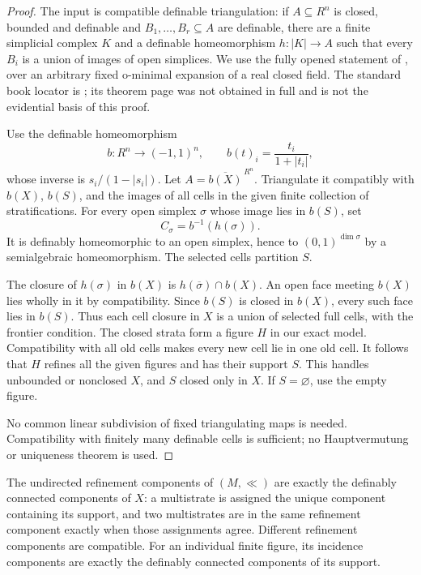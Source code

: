 \begin{proof}
The input is compatible definable triangulation:
if \(A\subseteq R^n\) is closed, bounded and
definable and \(B_1,\ldots,B_r\subseteq A\)
are definable, there are a finite simplicial
complex \(K\) and a definable homeomorphism
\(h:|K|\to A\) such that every \(B_i\)
is a union of images of open simplices.
We use the fully opened statement of
\citet[Theorem 4.4, \S4.3, p.~42;
proof pp.~42--44]{Coste1999}, over an
arbitrary fixed o-minimal expansion
of a real closed field.
The standard book locator is
\citet[Chapter 8, \S2, Theorem 2.9]{vandenDries1998};
its theorem page was not obtained
in full and is not the evidential
basis of this proof.

Use the definable homeomorphism
\[
 b:R^n\longrightarrow(-1,1)^n,\qquad
 b(t)_i=\frac{t_i}{1+|t_i|},
\]
whose inverse is \(s_i/(1-|s_i|)\).
Let \(A=\overline{b(X)}^{\,R^n}\).
Triangulate it compatibly with
\(b(X)\), \(b(S)\), and the images
of all cells in the given finite
collection of stratifications.
For every open simplex \(\sigma\)
whose image lies in \(b(S)\), set
\[
 C_\sigma=b^{-1}(h(\sigma)).
\]
It is definably homeomorphic to
an open simplex, hence to
\((0,1)^{\dim\sigma}\) by a
semialgebraic homeomorphism.
The selected cells partition \(S\).

The closure of \(h(\sigma)\)
in \(b(X)\) is
\(h(\overline\sigma)\cap b(X)\).
An open face meeting \(b(X)\)
lies wholly in it by compatibility.
Since \(b(S)\) is closed in
\(b(X)\), every such face lies
in \(b(S)\). Thus each cell
closure in \(X\) is a union
of selected full cells, with
the frontier condition.
The closed strata form a
figure \(H\) in our exact
model. Compatibility with
all old cells makes every
new cell lie in one old
cell. It follows that
\(H\) refines all the
given figures and has
their support \(S\).
This handles unbounded
or nonclosed \(X\), and
\(S\) closed only in \(X\).
If \(S=\varnothing\), use
the empty figure.

No common linear subdivision
of fixed triangulating maps
is needed. Compatibility
with finitely many definable
cells is sufficient; no
Hauptvermutung or uniqueness
theorem is used.
\end{proof}

\begin{proposition}\label{SA21-BM-cell-connected}
The undirected refinement components of \((M,\ll)\)
are exactly the definably connected components
of \(X\): a multistrate is assigned the unique
component containing its support, and two
multistrates are in the same refinement
component exactly when those assignments
agree. Different refinement components
are compatible. For an individual finite
figure, its incidence components are
exactly the definably connected components
of its support.
\end{proposition}


